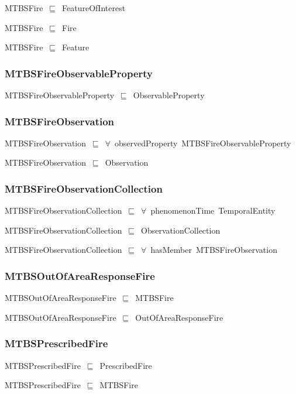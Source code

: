 \documentclass{article}
\begin{document}
MTBSFire~\ensuremath{\sqsubseteq}~FeatureOfInterest~

MTBSFire~\ensuremath{\sqsubseteq}~Fire~

MTBSFire~\ensuremath{\sqsubseteq}~Feature~

\subsubsection*{MTBSFireObservableProperty}

MTBSFireObservableProperty~\ensuremath{\sqsubseteq}~ObservableProperty~

\subsubsection*{MTBSFireObservation}

MTBSFireObservation~\ensuremath{\sqsubseteq}~\ensuremath{\forall}~observedProperty~MTBSFireObservableProperty~

MTBSFireObservation~\ensuremath{\sqsubseteq}~Observation~

\subsubsection*{MTBSFireObservationCollection}

MTBSFireObservationCollection~\ensuremath{\sqsubseteq}~\ensuremath{\forall}~phenomenonTime~TemporalEntity~

MTBSFireObservationCollection~\ensuremath{\sqsubseteq}~ObservationCollection~

MTBSFireObservationCollection~\ensuremath{\sqsubseteq}~\ensuremath{\forall}~hasMember~MTBSFireObservation~

\subsubsection*{MTBSOutOfAreaResponseFire}

MTBSOutOfAreaResponseFire~\ensuremath{\sqsubseteq}~MTBSFire~

MTBSOutOfAreaResponseFire~\ensuremath{\sqsubseteq}~OutOfAreaResponseFire~

\subsubsection*{MTBSPrescribedFire}

MTBSPrescribedFire~\ensuremath{\sqsubseteq}~PrescribedFire~

MTBSPrescribedFire~\ensuremath{\sqsubseteq}~MTBSFire~
\end{document}
